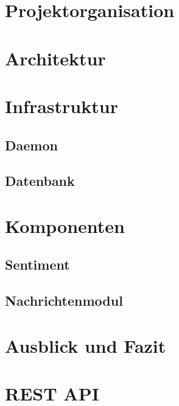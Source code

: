 \documentclass[12pt,a4paper,titlepage,german]{scrreprt}
\begin{document}
 

\setcounter{page}{1}




\chapter{Projektorganisation}
\label{cha:orga}





\chapter{Architektur}
\label{cha:architektur}


\chapter{Infrastruktur}
\label{cha:infrastruktur}
\section{Daemon}

\section{Datenbank}




\chapter{Komponenten}
\label{cha:komponenten}
\section{Sentiment}


\section{Nachrichtenmodul}




\chapter{Ausblick und Fazit}
\label{cha:ausblick}



\appendix

\chapter{REST API}

\end{document}
